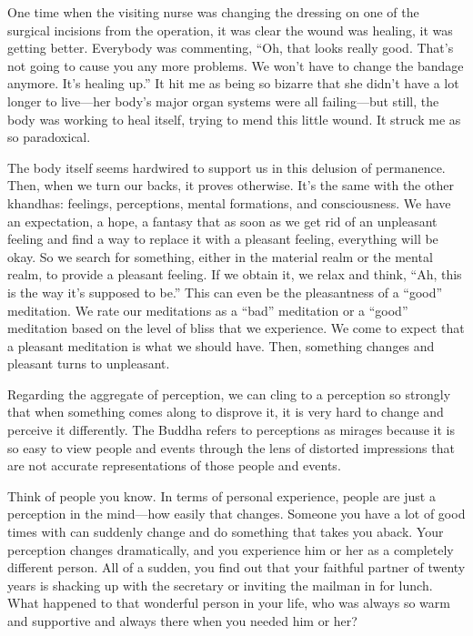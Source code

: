 One time when the visiting nurse was changing the dressing on one of the surgical incisions from the operation, it was clear the wound was healing, it was getting better. Everybody was commenting, ``Oh, that looks really good. That's not going to cause you any more problems. We won't have to change the bandage anymore. It's healing up.'' It hit me as being so bizarre that she didn't have a lot longer to live---her body's major organ systems were all failing---but still, the body was working to heal itself, trying to mend this little wound. It struck me as so paradoxical.

The body itself seems hardwired to support us in this delusion of permanence. Then, when we turn our backs, it proves otherwise. It's the same with the other khandhas: feelings, perceptions, mental formations, and consciousness. We have an expectation, a hope, a fantasy that as soon as we get rid of an unpleasant feeling and find a way to replace it with a pleasant feeling, everything will be okay. So we search for something, either in the material realm or the mental realm, to provide a pleasant feeling. If we obtain it, we relax and think, ``Ah, this is the way it's supposed to be.'' This can even be the pleasantness of a ``good'' {meditation. We rate our meditations as a} ``bad'' meditation or a ``good'' meditation based on the level of bliss that we experience. We come to expect that a pleasant meditation is what we should have. Then, something changes and pleasant turns to unpleasant.

Regarding the aggregate of perception, we can cling to a perception so strongly that when something comes along to disprove it, it is very hard to change and perceive it differently. The Buddha refers to perceptions as mirages because it is so easy to view people and events through the lens of distorted impressions that are not accurate representations of those people and events.

Think of people you know. In terms of personal experience, people are just a perception in the mind---how easily that changes. Someone you have a lot of good times with can suddenly change and do something that takes you aback. Your perception changes dramatically, and you experience him or her as a completely different person. All of a sudden, you find out that your faithful partner of twenty years is shacking up with the secretary or inviting the mailman in for lunch. What happened to that wonderful person in your life, who was always so warm and supportive and always there when you needed him or her?

